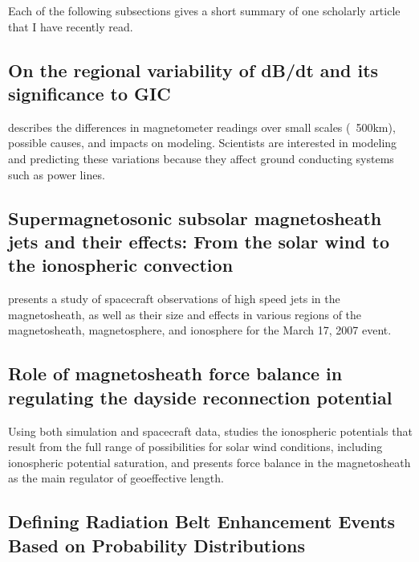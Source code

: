 \documentclass[12pt, letterpaper]{article}
\begin{document}

Each of the following subsections gives a short summary of one scholarly article that I have recently read. 


\subsection{On the regional variability of dB/dt and its significance to GIC}

\citet[]{Dimmock2020} describes the differences in magnetometer readings over small scales (~500km), possible causes, and impacts on modeling. Scientists are interested in modeling and predicting these variations because they affect ground conducting systems such as power lines.


\subsection{Supermagnetosonic subsolar magnetosheath jets and their effects: From the solar wind to the ionospheric convection}

\citet[]{Hietala2012} presents a study of spacecraft observations of high speed jets in the magnetosheath, as well as their size and effects in various regions of the magnetosheath, magnetosphere, and ionosphere for the March 17, 2007 event.


\subsection{Role of magnetosheath force balance in regulating the dayside reconnection potential}

Using both simulation and spacecraft data, \citet[]{Lopez2010} studies the ionospheric potentials that result from the full range of possibilities for solar wind conditions, including ionospheric potential saturation, and presents force balance in the magnetosheath as the main regulator of geoeffective length. 


\subsection{Defining Radiation Belt Enhancement Events Based on Probability Distributions}
\end{document}
